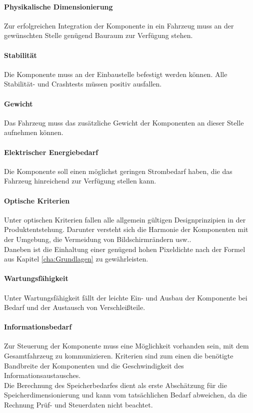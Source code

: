 \paragraph{Physikalische Dimensionierung}
Zur erfolgreichen Integration der Komponente in ein Fahrzeug muss an der gewünschten Stelle genügend Bauraum zur Verfügung stehen.
\paragraph{Stabilität}
Die Komponente muss an der Einbaustelle befestigt werden können. Alle Stabilität- und Crashtests müssen positiv ausfallen.
\paragraph{Gewicht}
Das Fahrzeug muss das zusätzliche Gewicht der Komponenten an dieser Stelle aufnehmen können.
\paragraph{Elektrischer Energiebedarf}
Die Komponente soll einen möglichst geringen Strombedarf haben, die das Fahrzeug hinreichend zur Verfügung stellen kann.
\paragraph{Optische Kriterien}
Unter optischen Kriterien fallen alle allgemein gültigen Designprinzipien in der Produktentstehung. Darunter versteht sich die Harmonie der Komponenten mit der Umgebung, die Vermeidung von Bildschirmrändern usw.. \\
Daneben ist die Einhaltung einer genügend hohen Pixeldichte nach der Formel aus Kapitel \ref{cha:Grundlagen} zu gewährleisten.
\paragraph{Wartungsfähigkeit}
Unter Wartungsfähigkeit fällt der leichte Ein- und Ausbau der Komponente bei Bedarf und der Austausch von Verschleißteile.
\paragraph{Informationsbedarf}
Zur Steuerung der Komponente muss eine Möglichkeit vorhanden sein, mit dem Gesamtfahrzeug zu kommunizieren. Kriterien sind zum einen die benötigte Bandbreite der Komponenten und die Geschwindigkeit des Informationsaustausches. \\
Die Berechnung des Speicherbedarfes dient als erste Abschätzung für die Speicherdimensionierung und kann vom tatsächlichen Bedarf abweichen, da die Rechnung Prüf- und Steuerdaten nicht beachtet.
